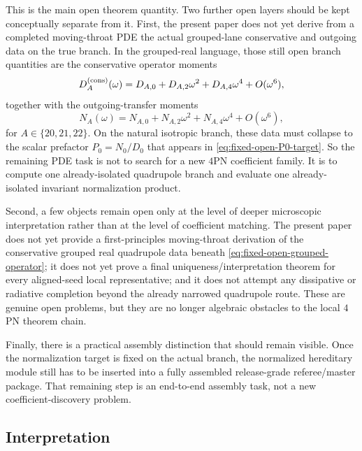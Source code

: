 \documentclass[11pt]{article}
\begin{document}
This is the main open theorem quantity.  Two further open layers should be kept
conceptually separate from it.  First, the present paper does not yet derive
from a completed moving-throat PDE the actual grouped-lane conservative and
outgoing data on the true branch.  In the grouped-real language, those still
open branch quantities are the conservative operator moments
\begin{equation}
D_A^{\rm(cons)}(\omega)
=
D_{A,0}+D_{A,2}\omega^2+D_{A,4}\omega^4+O(\omega^6),
\label{eq:fixed-open-grouped-operator}
\end{equation}
together with the outgoing-transfer moments
\begin{equation}
N_A(\omega)
=
N_{A,0}+N_{A,2}\omega^2+N_{A,4}\omega^4+O(\omega^6),
\label{eq:fixed-open-grouped-transfer}
\end{equation}
for $A\in\{20,21,22\}$.  On the natural isotropic branch, these data must
collapse to the scalar prefactor $P_0=N_0/D_0$ that appears in
\eqref{eq:fixed-open-P0-target}.  So the remaining PDE task is not to search
for a new $4$PN coefficient family.  It is to compute one already-isolated
quadrupole branch and evaluate one already-isolated invariant normalization
product.

Second, a few objects remain open only at the level of deeper microscopic
interpretation rather than at the level of coefficient matching.  The present
paper does not yet provide a first-principles moving-throat derivation of the
conservative grouped real quadrupole data beneath
\eqref{eq:fixed-open-grouped-operator}; it does not yet prove a final
uniqueness/interpretation theorem for every aligned-seed local representative;
and it does not attempt any dissipative or radiative completion beyond the
already narrowed quadrupole route.  These are genuine open problems, but they
are no longer algebraic obstacles to the local $4$PN theorem chain.

Finally, there is a practical assembly distinction that should remain visible.
Once the normalization target is fixed on the actual branch, the normalized
hereditary module still has to be inserted into a fully assembled release-grade
referee/master package.  That remaining step is an end-to-end assembly task, not
a new coefficient-discovery problem.

\subsection{Interpretation}
\label{sec:fixed-open-interpretation}
\end{document}
